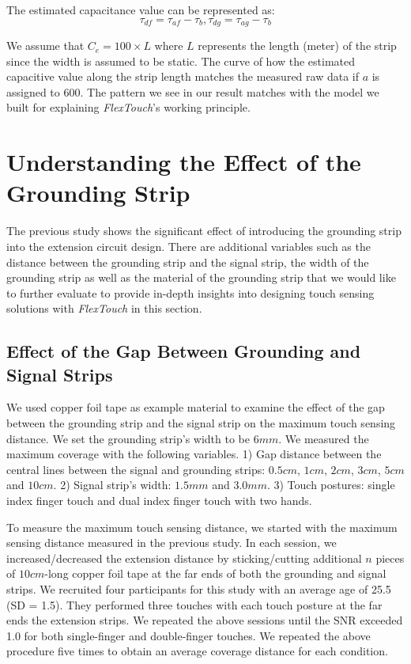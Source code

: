 The estimated capacitance value can be represented as:
\begin{equation}
    \tau_{df} = \tau_{af} - \tau_{b},  \tau_{dg} = \tau_{ag} - \tau_{b}
\end{equation}

We assume that $C_{e} = 100 \times L$ where $L$ represents the length (meter) of the strip since the width is assumed to be static. The curve of how the estimated capacitive value along the strip length matches the measured raw data if $a$ is assigned to 600. The pattern we see in our result matches with the model we built for explaining \textit{FlexTouch}'s working principle. 

\section{Understanding the Effect of the Grounding Strip}
The previous study shows the significant effect of introducing the grounding strip into the extension circuit design. There are additional variables such as the distance between the grounding strip and the signal strip, the width of the grounding strip as well as the material of the grounding strip that we would like to further evaluate to provide in-depth insights into designing touch sensing solutions with \textit{FlexTouch} in this section.

\subsection{Effect of the Gap Between Grounding and Signal Strips}

We used copper foil tape as example material to examine the effect of the gap between the grounding strip and the signal strip on the maximum touch sensing distance. We set the grounding strip's width to be $6 mm$. We measured the maximum coverage with the following variables. 1) Gap distance between the central lines between the signal and grounding strips: $0.5 cm$,  $1 cm$, $2 cm$, $3 cm$, $5 cm$ and $10 cm$. 2) Signal strip's width: $1.5 mm$ and $3.0 mm$. 3) Touch postures: single index finger touch and dual index finger touch with two hands.

To measure the maximum touch sensing distance, we started with the maximum sensing distance measured in the previous study. In each session, we increased/decreased the extension distance by sticking/cutting additional $n$ pieces of $10 cm$-long copper foil tape at the far ends of both the grounding and signal strips. We recruited four participants for this study with an average age of 25.5 (SD = 1.5). They performed three touches with each touch posture at the far ends the extension strips. We repeated the above sessions until the SNR exceeded 1.0 for both single-finger and double-finger touches. We repeated the above procedure five times to obtain an average coverage distance for each condition. 

